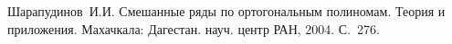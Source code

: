 \begin{thebibliography}{1}
Шарапудинов~И.И. Смешанные ряды по ортогональным полиномам. Теория и приложения. Махачкала: Дагестан. науч. центр РАН, 2004. С.~276.

%
%
%
%



\end{thebibliography}
